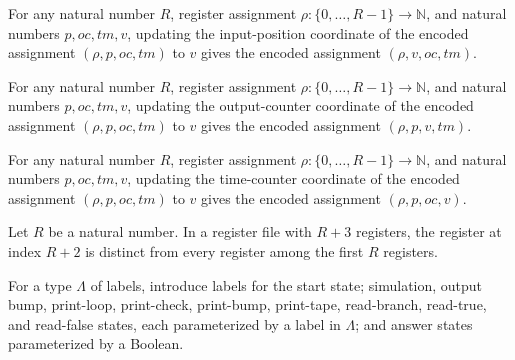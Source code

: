 \begin{lemma}
\label{Complexity.CPSim.upd_rP}
\leanok
{}
For any natural number $R$, register assignment $\rho:\{0,\ldots,R-1\}\to\mathbb N$, and
natural numbers $p,oc,tm,v$, updating the input-position coordinate of the encoded
assignment $(\rho,p,oc,tm)$ to $v$ gives the encoded assignment $(\rho,v,oc,tm)$.
\end{lemma}

\begin{lemma}
\label{Complexity.CPSim.upd_rO}
\leanok
{}
For any natural number $R$, register assignment $\rho:\{0,\ldots,R-1\}\to\mathbb N$, and
natural numbers $p,oc,tm,v$, updating the output-counter coordinate of the encoded
assignment $(\rho,p,oc,tm)$ to $v$ gives the encoded assignment $(\rho,p,v,tm)$.
\end{lemma}

\begin{lemma}
\label{Complexity.CPSim.upd_rT}
\leanok
{}
For any natural number $R$, register assignment $\rho:\{0,\ldots,R-1\}\to\mathbb N$, and
natural numbers $p,oc,tm,v$, updating the time-counter coordinate of the encoded
assignment $(\rho,p,oc,tm)$ to $v$ gives the encoded assignment $(\rho,p,oc,v)$.
\end{lemma}

\begin{lemma}
\label{Complexity.CPSim.rT_ne_rg}
\leanok
{}
Let $R$ be a natural number. In a register file with $R+3$ registers, the register at
index $R+2$ is distinct from every register among the first $R$ registers.
\end{lemma}

\begin{definition}
\label{Complexity.CPSim.Lb}
\leanok
For a type $\Lambda$ of labels, introduce labels for the start state; simulation, output
bump, print-loop, print-check, print-bump, print-tape, read-branch, read-true, and
read-false states, each parameterized by a label in $\Lambda$; and answer states
parameterized by a Boolean.
\end{definition}

